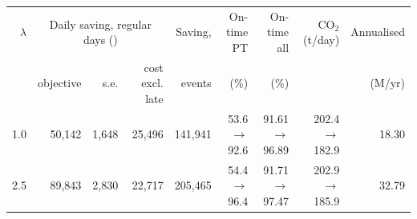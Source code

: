 \begin{tabular}{@{}rrrrrrrrr@{}}\toprule
$\lambda$ & \multicolumn{3}{c}{Daily saving, regular days (\EUR{})} & Saving, & On-time PT & On-time all & CO$_2$ (t/day) & Annualised \\
\cmidrule(lr){2-4}
 & objective & s.e. & cost excl. late & events & (\%) & (\%) & & (M\EUR{}/yr) \\ \midrule
1.0 & 50{,}142 & 1{,}648 & 25{,}496 & 141{,}941 & 53.6 $\to$ 92.6 & 91.61 $\to$ 96.89 & 202.4 $\to$ 182.9 & 18.30 \\
2.5 & 89{,}843 & 2{,}830 & 22{,}717 & 205{,}465 & 54.4 $\to$ 96.4 & 91.71 $\to$ 97.47 & 202.9 $\to$ 185.9 & 32.79 \\
\bottomrule\end{tabular}
